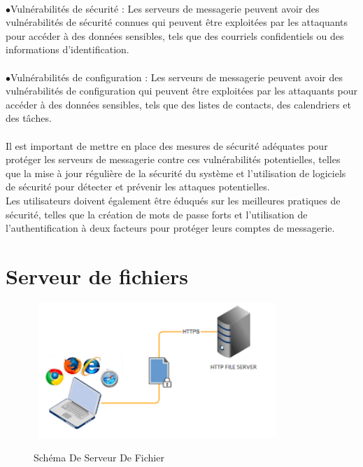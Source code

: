 \paragraph{ }
$\bullet$Vulnérabilités de sécurité : Les serveurs de messagerie peuvent avoir des vulnérabilités de sécurité connues qui peuvent être exploitées par les attaquants pour accéder à des données sensibles, tels que des courriels confidentiels ou des informations d'identification.

\paragraph{ }
$\bullet$Vulnérabilités de configuration : Les serveurs de messagerie peuvent avoir des vulnérabilités de configuration qui peuvent être exploitées par les attaquants pour accéder à des données sensibles, tels que des listes de contacts, des calendriers et des tâches.
\paragraph{ }
Il est important de mettre en place des mesures de sécurité adéquates pour protéger les serveurs de messagerie contre ces vulnérabilités potentielles, telles que la mise à jour régulière de la sécurité du système et l'utilisation de logiciels de sécurité pour détecter et prévenir les attaques potentielles.\\
 Les utilisateurs doivent également être éduqués sur les meilleures pratiques de sécurité, telles que la création de mots de passe forts et l'utilisation de l'authentification à deux facteurs pour protéger leurs comptes de messagerie.\\
\section{Serveur de fichiers}
	\begin{figure}[h]
		\hbox{
	\includegraphics[width=0.8\textwidth]{PhotoMemoire/serveur_fichier.png}}
\caption{Schéma De Serveur De Fichier }
\end{figure}
